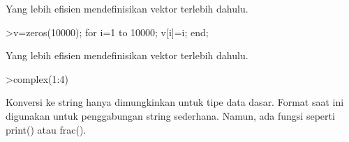 \documentclass[a4paper,10pt]{article}
\begin{document}
\begin{eulernotebook}
\begin{eulercomment}
\begin{eulercomment}
\begin{eulercomment}
\begin{eulercomment}
\begin{eulercomment}
\begin{eulercomment}
\begin{eulercomment}
\begin{eulercomment}
\begin{eulercomment}
\begin{eulercomment}
\begin{eulercomment}
\begin{eulercomment}
\begin{eulercomment}
\begin{eulercomment}
\begin{eulercomment}
\begin{eulercomment}
\begin{eulercomment}
\begin{eulercomment}
\begin{eulercomment}
\begin{eulercomment}
\begin{eulercomment}
\begin{eulercomment}
\begin{eulercomment}
\begin{eulercomment}
\begin{eulercomment}
\begin{eulercomment}
\begin{eulercomment}
\begin{eulercomment}
\begin{eulercomment}
\begin{eulercomment}
\begin{eulercomment}
\begin{eulercomment}
\begin{eulercomment}
\begin{eulercomment}
\begin{eulercomment}
Yang lebih efisien mendefinisikan vektor terlebih dahulu.
\end{eulercomment}
\begin{eulerprompt}
>v=zeros(10000); for i=1 to 10000; v[i]=i; end;
\end{eulerprompt}
\begin{eulercomment}
Yang lebih efisien mendefinisikan vektor terlebih dahulu.
\end{eulercomment}
\begin{eulerprompt}
>complex(1:4)
\end{eulerprompt}
\begin{euleroutput}
  [ 1+0i ,  2+0i ,  3+0i ,  4+0i  ]
\end{euleroutput}
\begin{eulercomment}
Konversi ke string hanya dimungkinkan untuk tipe data dasar. Format
saat ini digunakan untuk penggabungan string sederhana. Namun, ada
fungsi seperti print() atau frac().


\end{eulercomment}
\end{eulercomment}
\end{eulercomment}
\end{eulercomment}
\end{eulercomment}
\end{eulercomment}
\end{eulercomment}
\end{eulercomment}
\end{eulercomment}
\end{eulercomment}
\end{eulercomment}
\end{eulercomment}
\end{eulercomment}
\end{eulercomment}
\end{eulercomment}
\end{eulercomment}
\end{eulercomment}
\end{eulercomment}
\end{eulercomment}
\end{eulercomment}
\end{eulercomment}
\end{eulercomment}
\end{eulercomment}
\end{eulercomment}
\end{eulercomment}
\end{eulercomment}
\end{eulercomment}
\end{eulercomment}
\end{eulercomment}
\end{eulercomment}
\end{eulercomment}
\end{eulercomment}
\end{eulercomment}
\end{eulercomment}
\end{eulercomment}
\end{eulernotebook}
\end{document}
